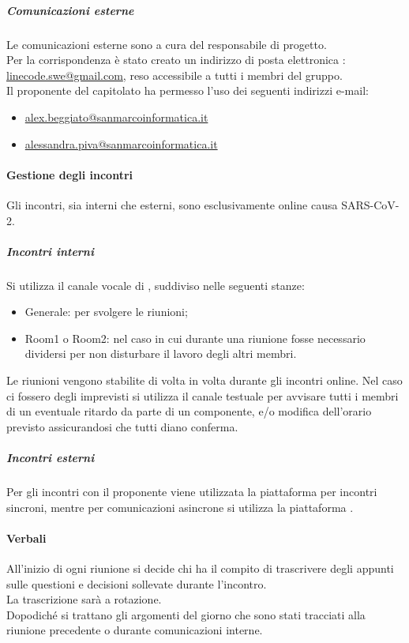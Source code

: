     		\subparagraph{Comunicazioni esterne}
    		Le comunicazioni esterne sono a cura del responsabile di progetto. \\
    		Per la corrispondenza è stato creato un indirizzo di posta elettronica : \url{linecode.swe@gmail.com}, reso accessibile a tutti i membri del gruppo.\\
    		Il proponente del capitolato ha  permesso l'uso dei seguenti indirizzi e-mail:
    		\begin{itemize}
    		    \item \url{alex.beggiato@sanmarcoinformatica.it}
    		 	\item \url{alessandra.piva@sanmarcoinformatica.it}
    		\end{itemize}

        \paragraph{Gestione degli incontri}
        Gli incontri, sia interni che esterni, sono esclusivamente online causa SARS-CoV-2.
            \subparagraph{Incontri interni}
            Si utilizza il canale vocale di , suddiviso nelle seguenti stanze:
            \begin{itemize}
                \item {\sffamily Generale}: per svolgere le riunioni;
                \item {\sffamily Room1} o {\sffamily Room2}: nel caso in cui durante una riunione fosse necessario dividersi per non disturbare il lavoro degli altri membri.
            \end{itemize}
            Le riunioni vengono stabilite di volta in volta durante gli incontri online.
            Nel caso ci fossero degli imprevisti si utilizza il canale testuale per avvisare tutti i membri di un eventuale ritardo da parte di un componente, e/o modifica dell'orario previsto assicurandosi che tutti diano conferma.

            \subparagraph{Incontri esterni}
            Per gli incontri con il proponente viene utilizzata la piattaforma  per incontri sincroni, mentre per comunicazioni asincrone si utilizza la piattaforma .

		\paragraph{Verbali}
        All'inizio di ogni riunione si decide chi ha il compito di trascrivere degli appunti sulle questioni e decisioni sollevate durante l'incontro. \\
        La trascrizione sarà a rotazione.\\
        Dopodiché si trattano gli argomenti del giorno che sono stati tracciati alla riunione precedente o durante comunicazioni interne.

